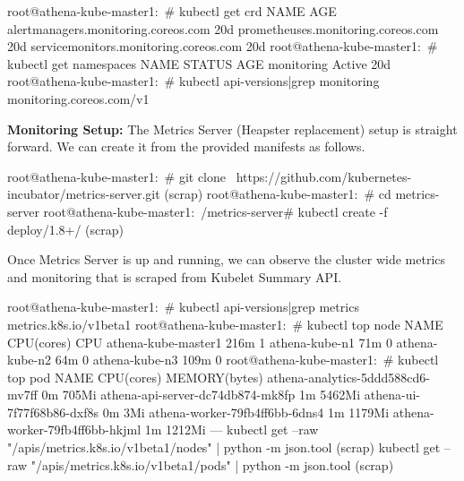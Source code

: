 \begin{small}
\begin{lcverbatim}
root@athena-kube-master1:~# kubectl get crd
NAME                                    AGE
alertmanagers.monitoring.coreos.com     20d
prometheuses.monitoring.coreos.com      20d
servicemonitors.monitoring.coreos.com   20d
root@athena-kube-master1:~# kubectl get namespaces
NAME          STATUS    AGE
monitoring    Active    20d
root@athena-kube-master1:~# kubectl api-versions|grep monitoring
monitoring.coreos.com/v1
\end{lcverbatim}
\end{small}

\noindent \textbf{Monitoring Setup:} \quad The Metrics Server (Heapster replacement) setup is straight forward. We can create it from the provided manifests as follows.

\begin{small}
\begin{lcverbatim}
root@athena-kube-master1:~# git clone \
		https://github.com/kubernetes-incubator/metrics-server.git
(scrap)
root@athena-kube-master1:~# cd metrics-server
root@athena-kube-master1:~/metrics-server# kubectl create -f deploy/1.8+/
(scrap)
\end{lcverbatim}
\end{small}

Once Metrics Server is up and running, we can observe the cluster wide metrics and monitoring that is scraped from Kubelet Summary API.

\begin{small}
\begin{lcverbatim}
root@athena-kube-master1:~# kubectl api-versions|grep metrics
metrics.k8s.io/v1beta1
root@athena-kube-master1:~# kubectl top node
NAME                  CPU(cores)   CPU%
athena-kube-master1   216m         1%
athena-kube-n1        71m          0%
athena-kube-n2        64m          0%
athena-kube-n3        109m         0%
root@athena-kube-master1:~# kubectl top pod
NAME                                CPU(cores)   MEMORY(bytes)
athena-analytics-5ddd588cd6-mv7ff   0m           705Mi
athena-api-server-dc74db874-mk8fp   1m           5462Mi
athena-ui-7f77f68b86-dxf8s          0m           3Mi
athena-worker-79fb4ff6bb-6dns4      1m           1179Mi
athena-worker-79fb4ff6bb-hkjml      1m           1212Mi
---
kubectl get --raw "/apis/metrics.k8s.io/v1beta1/nodes" | python -m json.tool
(scrap)
kubectl get --raw "/apis/metrics.k8s.io/v1beta1/pods" | python -m json.tool
(scrap)
\end{lcverbatim}
\end{small}

